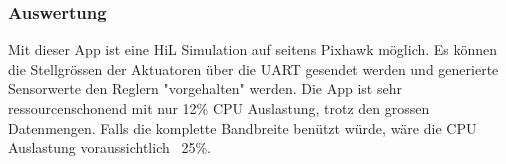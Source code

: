 \subsubsection{Auswertung}
Mit dieser App ist eine HiL Simulation auf seitens Pixhawk möglich. Es können die Stellgrössen der Aktuatoren über die UART gesendet werden und generierte Sensorwerte den Reglern "vorgehalten" werden. Die App ist sehr ressourcenschonend mit nur 12\% CPU Auslastung, trotz den grossen Datenmengen. Falls die komplette Bandbreite benützt würde, wäre die CPU Auslastung voraussichtlich ~25\%.


\clearpage